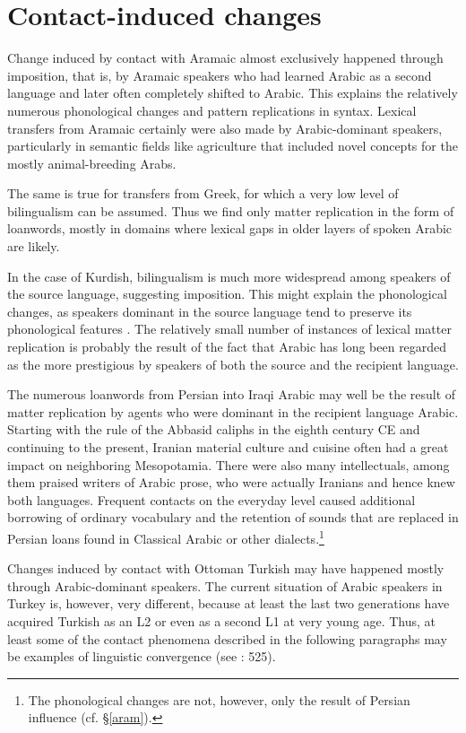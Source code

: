 \documentclass[output=paper]{langsci/langscibook}
\begin{document}
\section{Contact-induced changes} 

Change induced by contact with Aramaic almost exclusively happened through imposition, that is, by Aramaic speakers who had learned Arabic as a second language and later often completely shifted to Arabic. This explains the relatively numerous phonological changes and pattern replications in syntax. Lexical transfers from Aramaic certainly were also made by Arabic-dominant speakers, particularly in semantic fields like agriculture that included novel concepts for the mostly animal-breeding Arabs.

The same is true for transfers from Greek, for which a very low level of bilingualism can be assumed. Thus we find only matter replication in the form of loanwords, mostly in domains where lexical gaps in older layers of spoken Arabic are likely. 

In the case of Kurdish, bilingualism is much more widespread among speakers of the source language, suggesting imposition. This might explain the phonological changes, as speakers dominant in the source language tend to preserve its phonological features \citep[532]{Lucas2015}. The relatively small number of instances of lexical matter replication is probably the result of the fact that Arabic has long been regarded as the more prestigious by speakers of both the source and the recipient language.

The numerous loanwords from Persian into Iraqi Arabic may well be the result of matter replication by agents who were dominant in the recipient language Arabic. Starting with the rule of the Abbasid caliphs in the eighth century CE and continuing to the present, Iranian material culture and cuisine often had a great impact on neighboring Mesopotamia. There were also many intellectuals, among them praised writers of Arabic prose, who were actually Iranians and hence knew both languages. Frequent contacts on the everyday level caused additional borrowing of ordinary vocabulary and the retention of sounds that are replaced in Persian loans found in Classical Arabic or other dialects.\footnote{The phonological changes are not, however, only the result of Persian influence (cf. §\ref{aram}).} 

Changes induced by contact with Ottoman Turkish may have happened mostly through Arabic-dominant speakers. The current situation of Arabic speakers in Turkey is, however, very different, because at least the last two generations have acquired Turkish as an L2 or even as a second L1 at very young age. Thus, at least some of the contact phenomena described in the following paragraphs may be examples of linguistic convergence (see \citealt{Lucas2015}: 525). 
\end{document}
